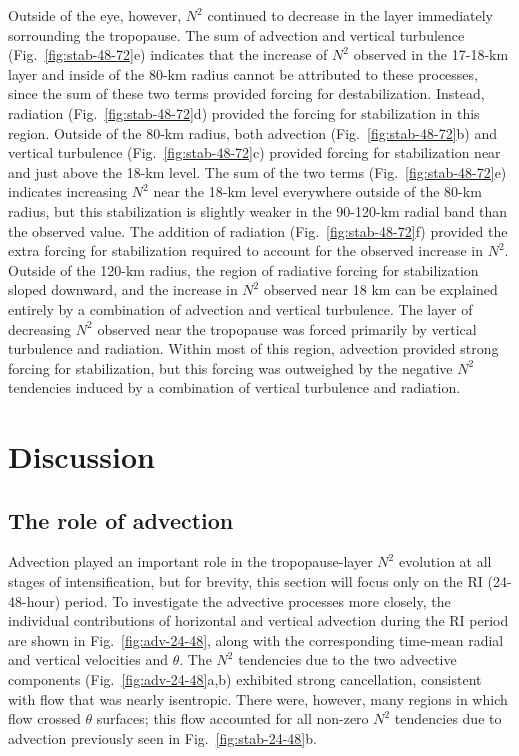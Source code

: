 \documentclass{ametsoc}
\begin{document}
Outside of the eye, however, $N^2$ continued to decrease in the layer immediately sorrounding the tropopause.
The sum of advection and vertical turbulence (Fig.~\ref{fig:stab-48-72}e) indicates that the increase of $N^2$ observed in the 17-18-km layer and inside of the 80-km radius cannot be attributed to these processes, since the sum of these two terms provided forcing for destabilization.
Instead, radiation (Fig.~\ref{fig:stab-48-72}d) provided the forcing for stabilization in this region.
Outside of the 80-km radius, both advection (Fig.~\ref{fig:stab-48-72}b) and vertical turbulence (Fig.~\ref{fig:stab-48-72}c) provided forcing for stabilization near and just above the 18-km level.
The sum of the two terms (Fig.~\ref{fig:stab-48-72}e) indicates increasing $N^2$ near the 18-km level everywhere outside of the 80-km radius, but this stabilization is slightly weaker in the 90-120-km radial band than the observed value.
The addition of radiation (Fig.~\ref{fig:stab-48-72}f) provided the extra forcing for stabilization required to account for the observed increase in $N^2$.
Outside of the 120-km radius, the region of radiative forcing for stabilization sloped downward, and the increase in $N^2$ observed near 18 km can be explained entirely by a combination of advection and vertical turbulence.
The layer of decreasing $N^2$ observed near the tropopause was forced primarily by vertical turbulence and radiation.
Within most of this region, advection provided strong forcing for stabilization, but this forcing was outweighed by the negative $N^2$ tendencies induced by a combination of vertical turbulence and radiation.

  \section{Discussion}

  \subsection{The role of advection}

Advection played an important role in the tropopause-layer $N^2$ evolution at all stages of intensification, but for brevity, this section will focus only on the RI (24-48-hour) period.
To investigate the advective processes more closely, the individual contributions of horizontal and vertical advection during the RI period are shown in Fig.~\ref{fig:adv-24-48}, along with the corresponding time-mean radial and vertical velocities and $\theta$.
The $N^2$ tendencies due to the two advective components (Fig.~\ref{fig:adv-24-48}a,b) exhibited strong cancellation, consistent with flow that was nearly isentropic.
There were, however, many regions in which flow crossed $\theta$ surfaces; this flow accounted for all non-zero $N^2$ tendencies due to advection previously seen in Fig.~\ref{fig:stab-24-48}b.
\end{document}
